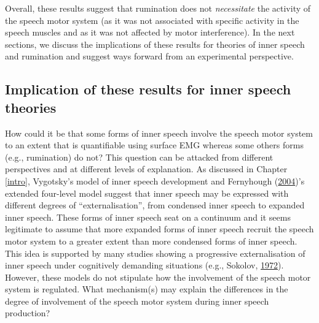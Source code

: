\documentclass[a4paper,12pt,twoside,openright,oldfontcommands,final]{memoir}
\begin{document}
Overall, these results suggest that rumination does not \emph{necessitate} the activity of the speech motor system (as it was not associated with specific activity in the speech muscles and as it was not affected by motor interference). In the next sections, we discuss the implications of these results for theories of inner speech and rumination and suggest ways forward from an experimental perspective.

\hypertarget{implication-of-these-results-for-inner-speech-theories}{%
\subsection{Implication of these results for inner speech theories}\label{implication-of-these-results-for-inner-speech-theories}}

How could it be that some forms of inner speech involve the speech motor system to an extent that is quantifiable using surface EMG whereas some others forms (e.g., rumination) do not? This question can be attacked from different perspectives and at different levels of explanation. As discussed in Chapter \ref{intro}, Vygotsky's model of inner speech development and Fernyhough (\protect\hyperlink{ref-fernyhough_alien_2004}{2004})'s extended four-level model suggest that inner speech may be expressed with different degrees of \enquote{externalisation}, from condensed inner speech to expanded inner speech. These forms of inner speech seat on a continuum and it seems legitimate to assume that more expanded forms of inner speech recruit the speech motor system to a greater extent than more condensed forms of inner speech. This idea is supported by many studies showing a progressive externalisation of inner speech under cognitively demanding situations (e.g., Sokolov, \protect\hyperlink{ref-sokolov_inner_1972}{1972}). However, these models do not stipulate how the involvement of the speech motor system is regulated. What mechanism(s) may explain the differences in the degree of involvement of the speech motor system during inner speech production?
\end{document}
